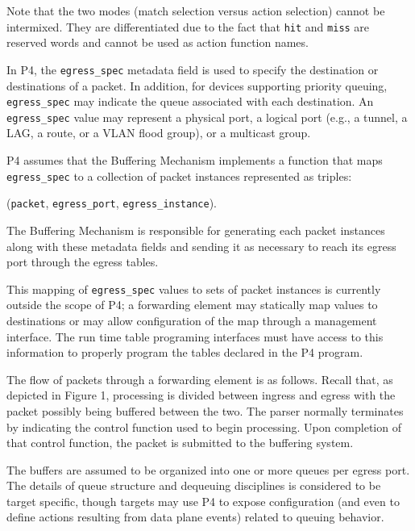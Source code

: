 \documentclass[12pt]{article}
\begin{document}
Note that the two modes (match selection versus action selection) cannot be
intermixed. They are differentiated due to the fact that \texttt{hit} and
\texttt{miss} are reserved words and cannot be used as action function names.



In P4, the \texttt{egress_spec} metadata field is used to specify the destination 
or destinations of a packet. In addition, for devices supporting priority 
queuing, \texttt{egress_spec} may indicate the queue associated with each destination. 
An \texttt{egress_spec} value may represent a physical port, a logical port (e.g., 
a tunnel, a LAG, a route, or a VLAN flood group), or a multicast group.

P4 assumes that the Buffering Mechanism implements a function that maps \texttt{egress_spec} to 
a collection of packet instances represented as triples:

\centerline{(\texttt{packet}, \texttt{egress_port}, \texttt{egress_instance}).}

 The Buffering Mechanism is responsible for generating 
each packet instances along with these metadata fields and sending it as necessary 
to reach its egress port through the egress \matchaction tables. 

This mapping of \texttt{egress_spec} values to sets of packet instances is currently 
outside the scope of P4; a forwarding element may statically map values to 
destinations or may allow configuration of the map through a management interface. 
The run time table programing interfaces must have access to this information 
to properly program the tables declared in the P4 program.

The flow of packets through a forwarding element is as follows. Recall that, 
as depicted in Figure 1, processing is divided between ingress and egress 
with the packet possibly being buffered between the two. The parser normally 
terminates by indicating the control function used to begin processing.  Upon 
completion of that control function, the packet is submitted to the buffering 
system.

The buffers are assumed to be organized into one or more queues per egress 
port. The details of queue structure and dequeuing disciplines is considered 
to be target specific, though targets may use P4 to expose configuration (and 
even to define actions resulting from data plane events) related to queuing 
behavior.
\end{document}
